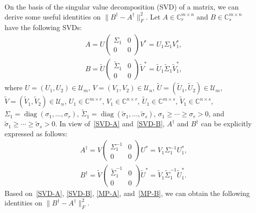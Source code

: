 \documentclass[11pt]{article}
\DeclareMathOperator*{\diag}{diag}
\begin{document}
On the basis of the singular value decomposition (SVD) of a matrix, we can derive some useful identities on $\|B^{\dagger}-A^{\dagger}\|_{F}^{2}$. Let $A\in\mathbb{C}^{m\times n}_{r}$ and $B\in\mathbb{C}^{m\times n}_{s}$ have the following SVDs:
\begin{subequations}
\begin{align}
&A=U\begin{pmatrix}
\Sigma_{1} & 0 \\
0 & 0
\end{pmatrix}V^{\ast}=U_{1}\Sigma_{1}V_{1}^{\ast},\label{SVD-A}\\
&B=\widetilde{U}\begin{pmatrix}
\widetilde{\Sigma}_{1} & 0 \\
0 & 0 
\end{pmatrix}\widetilde{V}^{\ast}=\widetilde{U}_{1}\widetilde{\Sigma}_{1}\widetilde{V}_{1}^{\ast},\label{SVD-B}
\end{align}
\end{subequations}
where $U=(U_{1},U_{2})\in\mathscr{U}_{m}$, $V=(V_{1},V_{2})\in\mathscr{U}_{n}$, $\widetilde{U}=(\widetilde{U}_{1},\widetilde{U}_{2})\in\mathscr{U}_{m}$, $\widetilde{V}=(\widetilde{V}_{1},\widetilde{V}_{2})\in\mathscr{U}_{n}$, $U_{1}\in\mathbb{C}^{m\times r}$, $V_{1}\in\mathbb{C}^{n\times r}$, $\widetilde{U}_{1}\in\mathbb{C}^{m\times s}$, $\widetilde{V}_{1}\in\mathbb{C}^{n\times s}$, $\Sigma_{1}=\diag(\sigma_{1},\ldots,\sigma_{r})$, $\widetilde{\Sigma}_{1}=\diag(\widetilde{\sigma}_{1},\ldots,\widetilde{\sigma}_{s})$, $\sigma_{1}\geq\cdots\geq\sigma_{r}>0$, and $\widetilde{\sigma}_{1}\geq\cdots\geq\widetilde{\sigma}_{s}>0$. In view of~\eqref{SVD-A} and~\eqref{SVD-B}, $A^{\dagger}$ and $B^{\dagger}$ can be explicitly expressed as follows:
\begin{subequations}
\begin{align}
&A^{\dagger}=V\begin{pmatrix}
\Sigma_{1}^{-1} & 0 \\
0 & 0
\end{pmatrix}U^{\ast}=V_{1}\Sigma_{1}^{-1}U_{1}^{\ast},\label{MP-A}\\
&B^{\dagger}=\widetilde{V}\begin{pmatrix}
\widetilde{\Sigma}_{1}^{-1} & 0 \\
0 & 0
\end{pmatrix}\widetilde{U}^{\ast}=\widetilde{V}_{1}\widetilde{\Sigma}_{1}^{-1}\widetilde{U}_{1}^{\ast}.\label{MP-B}
\end{align}
\end{subequations}
Based on~\eqref{SVD-A}, \eqref{SVD-B}, \eqref{MP-A}, and~\eqref{MP-B}, we can obtain the following identities on $\|B^{\dagger}-A^{\dagger}\|_{F}^{2}$.
\end{document}
